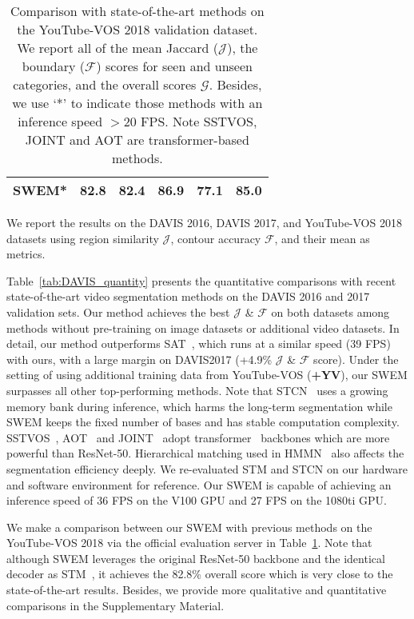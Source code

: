 \begin{table}[t]
\begin{center}
\begin{tabular}{cccccc}
\midrule
\textbf{SWEM*}                         & 82.8 & \textbf{82.4} & \textbf{86.9} & 77.1 & 85.0 \\
\bottomrule
\end{tabular}
\end{center}
\vspace{-0.4 cm}
\caption{Comparison with state-of-the-art methods on the YouTube-VOS 2018 validation dataset. We report all of the mean Jaccard ($\mathcal{J}$), the boundary ($\mathcal{F}$) scores for seen and unseen categories, and the overall scores $\mathcal{G}$. Besides, we use `*' to indicate those methods with an inference speed $>20$ FPS. Note SSTVOS, JOINT and AOT are transformer-based methods.}
\label{tab:YTVOS}
\vspace{-0.5 cm}
\end{table}

 We report the results on the DAVIS 2016, DAVIS 2017, and YouTube-VOS 2018 datasets using region similarity $\mathcal{J}$, contour accuracy $\mathcal{F}$, and their mean as metrics. 

 Table~\ref{tab:DAVIS_quantity} presents the quantitative comparisons with recent state-of-the-art video segmentation methods on the DAVIS 2016 and 2017 validation sets. Our method achieves the best $\mathcal{J}$ \& $\mathcal{F}$ on both datasets among methods without pre-training on image datasets or additional video datasets. In detail, our method outperforms SAT~\cite{Chen_2020_CVPR}, which runs at a similar speed (39 FPS) with ours, with a large margin on DAVIS2017 (+4.9\% $\mathcal{J}$ \& $\mathcal{F}$ score). Under the setting of using additional training data from YouTube-VOS (\textbf{+YV}), our SWEM surpasses all other top-performing methods. Note that STCN~\cite{cheng2021stcn} uses a growing memory bank during inference, which harms the long-term segmentation while SWEM keeps the fixed number of bases and has stable computation complexity. SSTVOS~\cite{duke2021sstvos}, AOT~\cite{yang2021associating} and JOINT~\cite{mao2021joint} adopt transformer~\cite{vaswani2017attention} backbones which are more powerful than ResNet-50. Hierarchical matching used in HMMN~\cite{seong2021hierarchical} also affects the segmentation efficiency deeply. We re-evaluated STM and STCN on our hardware and software environment for reference. Our SWEM is capable of achieving an inference speed of 36 FPS on the V100 GPU and 27 FPS on the 1080ti GPU. 

 We make a comparison between our SWEM with previous methods on the YouTube-VOS 2018 via the official evaluation server in Table~\ref{tab:YTVOS}. Note that although SWEM leverages the original ResNet-50 backbone and the identical decoder as STM~\cite{Oh_2019_ICCV}, it achieves the 82.8\% overall score which is very close to the state-of-the-art results. Besides, we provide more qualitative and quantitative comparisons in the Supplementary Material.

